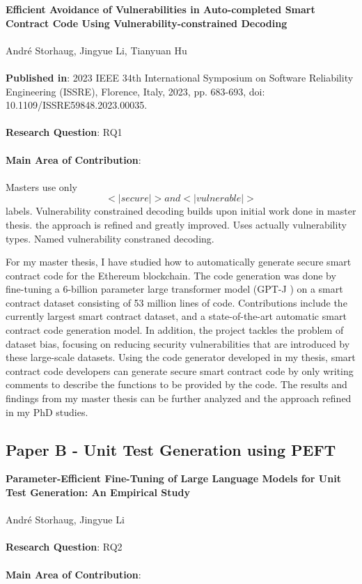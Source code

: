 \documentclass{article}
\begin{document}
\textbf{Efficient Avoidance of Vulnerabilities in Auto-completed Smart Contract Code Using Vulnerability-constrained Decoding}\\\\
\noindent Andr\'e Storhaug, Jingyue Li, Tianyuan Hu\\\\
\noindent \textbf{Published in}: 2023 IEEE 34th International Symposium on Software Reliability Engineering (ISSRE), Florence, Italy, 2023, pp. 683-693, doi: 10.1109/ISSRE59848.2023.00035.\\\\
\noindent \textbf{Research Question}: RQ1\\\\
\noindent \textbf{Main Area of Contribution}: \\\\

Masters use only $$<|secure|> and <|vulnerable|>$$ labels. Vulnerability constrained decoding builds upon initial work done in master thesis. the approach is refined and greatly improved. Uses actually vulnerability types. Named vulnerability constraned decoding.

For my master thesis, I have studied how to automatically generate secure smart contract code for the Ethereum blockchain. The code generation was done by fine-tuning a 6-billion parameter large transformer model (GPT-J \cite{gpt-j}) on a smart contract dataset consisting of 53 million lines of code. Contributions include the currently largest smart contract dataset, and a state-of-the-art automatic smart contract code generation model. In addition, the project tackles the problem of dataset bias, focusing on reducing security vulnerabilities that are introduced by these large-scale datasets. Using the code generator developed in my thesis, smart contract code developers can generate secure smart contract code by only writing comments to describe the functions to be provided by the code. The results and findings from my master thesis can be further analyzed and the approach refined in my PhD studies.

\subsection{Paper B - Unit Test Generation using PEFT}
\textbf{Parameter-Efficient Fine-Tuning of Large Language Models for Unit Test Generation: An Empirical Study}\\\\
\noindent Andr\'e Storhaug, Jingyue Li\\\\
\noindent \textbf{Research Question}: RQ2\\\\
\noindent \textbf{Main Area of Contribution}: \\\\
\end{document}
